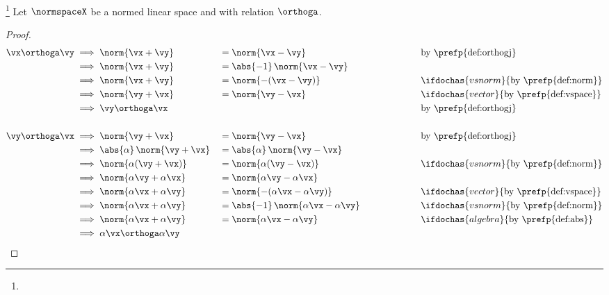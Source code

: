 \begin{theorem}
\footnote{
  }
Let $\normspaceX$ be a normed linear space and
with   relation $\orthoga$.
\thmbox{
  \vx \orthoga \vy
  \qquad\iff\qquad
  \vy \orthoga \vx
  \qquad\iff\qquad
  \alpha\vx \orthoga \alpha\vy
  \qquad\scriptstyle \forall\alpha\in\F
  }
\end{theorem}
\begin{proof}
  \begin{align*}
    \vx \orthoga \vy
      &\implies \norm{\vx+\vy} &&= \norm{\vx-\vy} \hspace{4cm} %
      &&        \text{by \prefp{def:orthogj}}
    \\&\implies \norm{\vx+\vy} &&= \abs{-1}\,\norm{\vx-\vy}
    \\&\implies \norm{\vx+\vy} &&= \norm{-(\vx-\vy)}
      &&        \ifdochas{vsnorm}{\text{by \prefp{def:norm}}}
    \\&\implies \norm{\vy+\vx} &&= \norm{\vy-\vx}
      &&        \ifdochas{vector}{\text{by \prefp{def:vspace}}}
    \\&\implies \vy \orthoga \vx
      &&&&      \text{by \prefp{def:orthogj}}
    \\
    \\
    \vy \orthoga \vx
      &\implies \norm{\vy+\vx} &&= \norm{\vy-\vx}
      &&        \text{by \prefp{def:orthogj}}
    \\&\implies \abs{\alpha}\,\norm{\vy+\vx} &&= \abs{\alpha}\,\norm{\vy-\vx}
    \\&\implies \norm{\alpha(\vy+\vx)} &&= \norm{\alpha(\vy-\vx)}
      &&        \ifdochas{vsnorm}{\text{by \prefp{def:norm}}}
    \\&\implies \norm{\alpha\vy+\alpha\vx} &&= \norm{\alpha\vy-\alpha\vx}
    \\&\implies \norm{\alpha\vx+\alpha\vy} &&= \norm{-(\alpha\vx-\alpha\vy)}
      &&        \ifdochas{vector}{\text{by \prefp{def:vspace}}}
    \\&\implies \norm{\alpha\vx+\alpha\vy} &&= \abs{-1}\,\norm{\alpha\vx-\alpha\vy}
      &&        \ifdochas{vsnorm}{\text{by \prefp{def:norm}}}
    \\&\implies \norm{\alpha\vx+\alpha\vy} &&= \norm{\alpha\vx-\alpha\vy}
      &&        \ifdochas{algebra}{\text{by \prefp{def:abs}}}
    \\&\implies \alpha\vx \orthoga \alpha\vy

\end{align*}
\end{proof}
